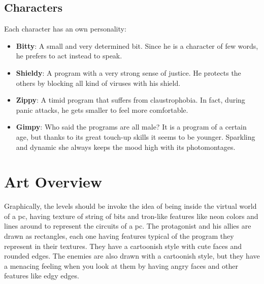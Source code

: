 \documentclass[12pt, a4paper]{report}
\begin{document}
\section*{Characters}
Each character has an own personality:
\begin{itemize}
\item \textbf{Bitty}: A small and very determined bit. Since he is a character of few words, he prefers to act instead to speak.
\item \textbf{Shieldy}: A program with a very strong sense of justice. He protects the others by blocking all kind of viruses with his shield.
\item \textbf{Zippy}: A timid program that suffers from claustrophobia. In fact, during panic attacks, he gets smaller to feel more comfortable.
\item \textbf{Gimpy}: Who said the programs are all male? It is a program of a certain age, but thanks to its great touch-up skills it seems to be younger. Sparkling and dynamic she always keeps the mood high with its photomontages.
\end{itemize}

\chapter{Art Overview}
Graphically, the levels should be invoke the idea of being inside the virtual world of a pc, having texture of string of bits and tron-like features like neon colors and lines around to represent the circuits of a pc.
The protagonist and his allies are drawn as rectangles, each one having features typical of the program they represent in their textures. They have a cartoonish style with cute faces and rounded edges. The enemies are also drawn with a cartoonish style, but they have a menacing feeling when you look at them by having angry faces and other features like edgy edges.\\
\end{document}
